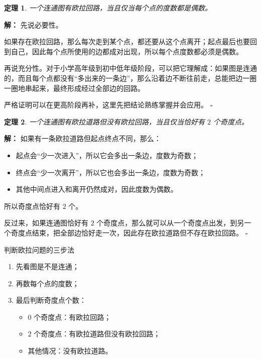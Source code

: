 \documentclass[11pt,a4paper,fontset=fandol]{ctexart}
\theoremstyle{formaltheorem}
\newtheorem{theorem}{定理}[section]
\theoremstyle{formalexample}
\newenvironment{solution}{\par\noindent\textbf{解：}}{\hfill$\square$\par}
\begin{document}
\begin{theorem}
一个连通图有欧拉回路，当且仅当每个点的度数都是偶数。
\end{theorem}

\begin{solution}
先说必要性。

如果存在欧拉回路，那么每次走到某个点，都还要从这个点离开；起点最后也要回到自己，因此每个点所使用的边都成对出现，所以每个点度数都必须是偶数。

再说充分性。对于小学高年级到初中低年级阶段，可以把它理解成：如果图是连通的，而且每个点都没有“多出来的一条边”，那么沿着边不断往前走，总能把边一圈一圈地串起来，最终形成经过全部边的回路。

严格证明可以在更高阶段再补，这里先把结论熟练掌握并会应用。
\end{solution}

\begin{theorem}
一个连通图有欧拉道路但没有欧拉回路，当且仅当恰好有 $2$ 个奇度点。
\end{theorem}

\begin{solution}
如果有一条欧拉道路但起点终点不同，那么：
\begin{itemize}
  \item 起点会“少一次进入”，所以它会多出一条边，度数为奇数；
  \item 终点会“少一次离开”，所以它也会多出一条边，度数为奇数；
  \item 其他中间点进入和离开仍然成对，因此度数为偶数。
\end{itemize}

  所以奇度点恰好有 $2$ 个。

反过来，如果连通图恰好有 $2$ 个奇度点，那么就可以从一个奇度点出发，到另一个奇度点结束，把全部边恰好走一次，因此存在欧拉道路但不存在欧拉回路。
\end{solution}

\begin{skillbox}{判断欧拉问题的三步法}
\begin{enumerate}
  \item 先看图是不是连通；
  \item 再数每个点的度数；
  \item 最后判断奇度点个数：
  \begin{itemize}
    \item $0$ 个奇度点：有欧拉回路；
    \item $2$ 个奇度点：有欧拉道路但没有欧拉回路；
    \item 其他情况：没有欧拉道路。
  \end{itemize}
\end{enumerate}
\end{skillbox}
\end{document}
